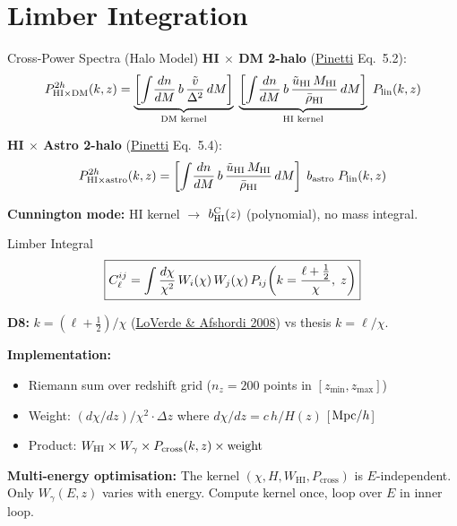 \section{Limber Integration}

\begin{frame}{Cross-Power Spectra (Halo Model)}
\textbf{HI $\times$ DM 2-halo} (\href{https://arxiv.org/abs/1911.04989}{Pinetti} Eq.~5.2):
\begin{equation}
P_{\mathrm{HI\times DM}}^{2h}(k,z) = \underbrace{\left[\int\!\frac{dn}{dM}\,b\,\frac{\tilde{v}}{\Delta^2}\,dM\right]}_{\text{DM kernel}}\;\underbrace{\left[\int\!\frac{dn}{dM}\,b\,\frac{\tilde{u}_{\mathrm{HI}}\,M_{\mathrm{HI}}}{\bar\rho_{\mathrm{HI}}}\,dM\right]}_{\text{HI kernel}}\;P_{\mathrm{lin}}(k,z)
\end{equation}

\textbf{HI $\times$ Astro 2-halo} (\href{https://arxiv.org/abs/1911.04989}{Pinetti} Eq.~5.4):
\begin{equation}
P_{\mathrm{HI\times astro}}^{2h}(k,z) = \left[\int\!\frac{dn}{dM}\,b\,\frac{\tilde{u}_{\mathrm{HI}}\,M_{\mathrm{HI}}}{\bar\rho_{\mathrm{HI}}}\,dM\right]\;b_{\mathrm{astro}}\;P_{\mathrm{lin}}(k,z)
\end{equation}

\vspace{0.2cm}
\textbf{Cunnington mode:} HI kernel $\to$ $b_{\mathrm{HI}}^{\mathrm{C}}(z)$ (polynomial), no mass integral.
\end{frame}

\begin{frame}{Limber Integral}
\begin{equation}
\boxed{C_\ell^{ij} = \int \frac{d\chi}{\chi^2}\,W_i(\chi)\,W_j(\chi)\,P_{ij}\!\left(k = \frac{\ell + \tfrac{1}{2}}{\chi},\;z\right)}
\end{equation}

\textbf{D8:} $k = (\ell + \frac{1}{2})/\chi$ (\href{https://arxiv.org/abs/0809.5112}{LoVerde \& Afshordi 2008}) vs thesis $k = \ell/\chi$.

\vspace{0.3cm}
\textbf{Implementation:}
\begin{itemize}
    \item Riemann sum over redshift grid ($n_z = 200$ points in $[z_{\min}, z_{\max}]$)
    \item Weight: $(d\chi/dz) / \chi^2 \cdot \Delta z$ where $d\chi/dz = c\,h/H(z)$ [$\,\mathrm{Mpc}/h$]
    \item Product: $W_{\mathrm{HI}} \times W_\gamma \times P_{\mathrm{cross}}(k,z) \times \text{weight}$
\end{itemize}

\vspace{0.2cm}
\textbf{Multi-energy optimisation:} The kernel $(\chi, H, W_{\mathrm{HI}}, P_{\mathrm{cross}})$ is $E$-independent. Only $W_\gamma(E,z)$ varies with energy. Compute kernel once, loop over $E$ in inner loop.
\end{frame}

